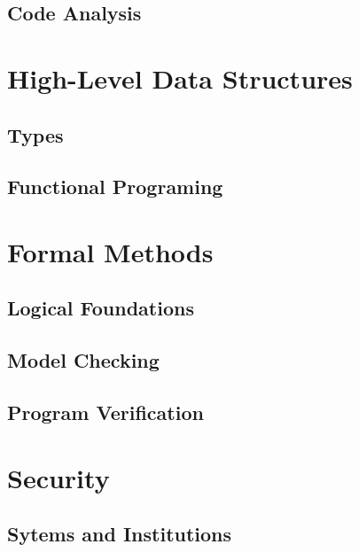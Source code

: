 \documentclass{book}
\begin{document}
  \chapter{Code Analysis}
    
    

\part{High-Level Data Structures}

  \chapter{Types}

  \chapter{Functional Programing}

\part{Formal Methods}

  \chapter{Logical Foundations}

  \chapter{Model Checking} %
    

  \chapter{Program Verification} %
   

\part{Security}

  \chapter{Sytems and Institutions}
\end{document}
